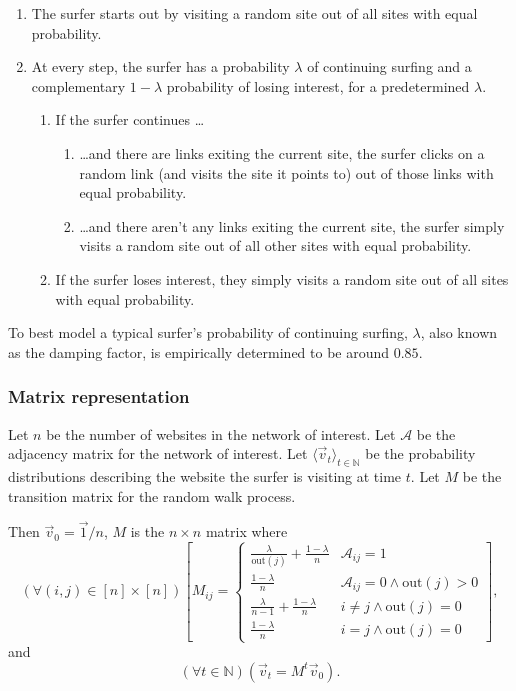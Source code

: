\documentclass[12pt, titlepage, twoside]{amsart}
\newcommand{\N}{\ensuremath{\mathbb N}}
\begin{document}
\begin{enumerate}
  \item The surfer starts out by visiting a random site out of all sites with equal probability.
  \item At every step, the surfer has a probability $\lambda$ of continuing surfing and a complementary
    $1 - \lambda$ probability of losing interest, for a predetermined $\lambda$.
  
    \begin{enumerate}
      \item If the surfer continues \ldots

        \begin{enumerate}
          \item \ldots and there are links exiting the current site, the surfer
            clicks on a random link (and visits the site it points to) out of those links with equal probability.
          \item \ldots and there aren't any links exiting the current site, the surfer simply
            visits a random site out of all other sites with equal probability.
        \end{enumerate}

      \item If the surfer loses interest, they simply visits a random site out of all sites with equal probability.
    \end{enumerate}

\end{enumerate}

To best model a typical surfer's probability of continuing surfing, $\lambda$, also known as the damping factor,
is empirically determined to be around $0.85$.

\subsubsection{Matrix representation}

Let $n$ be the number of websites in the network of interest.
Let $\mathcal{A}$ be the adjacency matrix for the network of interest.
Let $\langle\vec{v}_{t}\rangle_{t\in\N}$ be the probability distributions describing the
website the surfer is visiting at time $t$.
Let $M$ be the transition matrix for the random walk process.

Then $\vec{v}_0 = \vec{1} / n$,
$M$ is the $n\times n$ matrix where
\[
  (\forall (i, j)\in[n]\times[n])
  \left[
  M_{ij} =
  \begin{cases}
    \frac{\lambda}{\mathrm{out}(j)} + \frac{1 - \lambda}{n}
    & \mathcal{A}_{ij} = 1 \\
    \frac{1 - \lambda}{n}
    & \mathcal{A}_{ij} = 0\wedge\mathrm{out}(j) > 0 \\
    \frac{\lambda}{n - 1} + \frac{1 - \lambda}{n}
    & i \neq j\wedge\mathrm{out}(j) = 0 \\
    \frac{1 - \lambda}{n}
    & i = j\wedge\mathrm{out}(j) = 0
  \end{cases}
  \right],
\]
and
\[
  (\forall t\in\N)\left(\vec{v}_t = M^t\vec{v}_0\right).
\]
\end{document}
